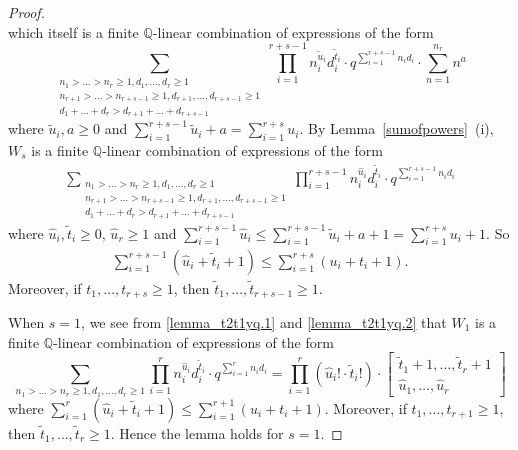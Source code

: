 \documentclass[10pt,a4paper]{amsart}
\newcommand{\Q}{ \mathbb Q }
\newcommand{\w}{\tilde}
\begin{document}
\begin{proof}
$$$$
which itself is a finite $\Q$-linear combination of expressions of the form
$$
\sum_{\substack{n_1 > \ldots > n_r \ge 1, d_1, \ldots, d_r \ge 1\\
    n_{r+1} > \ldots > n_{r+s-1} \ge 1, d_{r+1}, \ldots, d_{r+s-1} \ge 1\\
    d_1+ \ldots + d_r > d_{r+1} + \ldots + d_{r+s-1}}}
   \prod_{i=1}^{r+s-1} n_i^{\w u_i}d_i^{\w t_i}  
   \cdot q^{\sum_{i=1}^{r+s-1} n_i d_i} \cdot \sum_{n=1}^{n_r} n^a
$$
where $\w u_i, a \ge 0$ and $\sum_{i=1}^{r+s-1} \w u_i +a 
= \sum_{i=1}^{r+s} u_i$. By Lemma~\ref{sumofpowers}~(i), 
$W_s$ is a finite $\Q$-linear combination of expressions of the form
\begin{eqnarray}  \label{lemma_t2t1yq.1}
\sum_{\substack{n_1 > \ldots > n_r \ge 1, d_1, \ldots, d_r \ge 1\\
    n_{r+1} > \ldots > n_{r+s-1} \ge 1, d_{r+1}, \ldots, d_{r+s-1} \ge 1\\
    d_1+ \ldots + d_r > d_{r+1} + \ldots + d_{r+s-1}}}
   \prod_{i=1}^{r+s-1} n_i^{\hat u_i}d_i^{\w t_i}  
   \cdot q^{\sum_{i=1}^{r+s-1} n_i d_i}
\end{eqnarray}
where $\hat u_i, \w t_i \ge 0$, $\hat u_r \ge 1$ and 
$\sum_{i=1}^{r+s-1} \hat u_i \le 
\sum_{i=1}^{r+s-1} \w u_i +a + 1 = \sum_{i=1}^{r+s} u_i + 1$. So
\begin{eqnarray}  \label{lemma_t2t1yq.2}
\sum_{i=1}^{r+s-1} (\hat u_i + \w t_i + 1)   
\le \sum_{i=1}^{r+s} (u_i + t_i + 1).
\end{eqnarray}
Moreover,
if $t_1, \ldots, t_{r+s} \ge 1$, then $\w t_1, \ldots, \w t_{r+s-1} \ge 1$. 

When $s=1$, we see from \eqref{lemma_t2t1yq.1} and \eqref{lemma_t2t1yq.2}
that $W_1$ is a finite $\Q$-linear combination of expressions of the form
$$
\sum_{n_1 > \ldots > n_r \ge 1, d_1, \ldots, d_r \ge 1}
   \prod_{i=1}^{r} n_i^{\hat u_i}d_i^{\w t_i}  
   \cdot q^{\sum_{i=1}^{r} n_i d_i}
= \prod_{i=1}^{r} (\hat u_i! \cdot \w t_i!) \cdot 
   \begin{bmatrix} \w t_1 + 1, \ldots, \w t_r + 1\\
     \hat u_1, \ldots, \hat u_r 
   \end{bmatrix}
$$
where $\sum_{i=1}^{r} (\hat u_i + \w t_i + 1)   
\le \sum_{i=1}^{r+1} (u_i + t_i + 1)$. Moreover,
if $t_1, \ldots, t_{r+1} \ge 1$, then $\w t_1, \ldots, \w t_{r} \ge 1$. 
Hence the lemma holds for $s=1$.


\end{proof}
\end{document}
